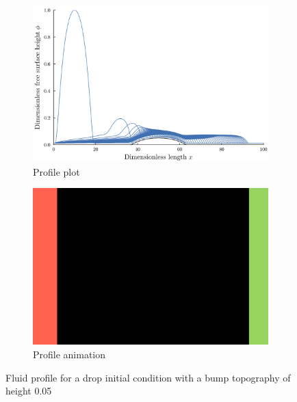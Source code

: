 \begin{frame}
    \begin{figure}
        \centering
        \begin{subfigure}[ht]{.5\textwidth}
            \includegraphics[width=\textwidth]{images/bump_05/plt_notitle.png}
            \caption{Profile plot}
            \label{fig:drop_05_profile}
        \end{subfigure}%
        \begin{subfigure}[ht]{.5\textwidth}
            \includegraphics[width=\textwidth]{images/placeholder.png}
            \caption{Profile animation}
            \label{fig:drop_05_anim}
        \end{subfigure}
        \caption{Fluid profile for a drop initial condition with a bump topography of height 0.05} 
    \end{figure}
\end{frame} 